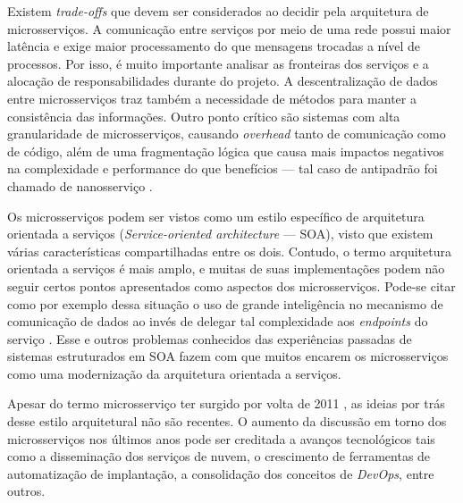 Existem \emph{trade-offs} que devem ser considerados ao decidir pela arquitetura de microsserviços. A comunicação entre serviços por meio de uma rede possui maior latência e exige maior processamento do que mensagens trocadas a nível de processos. Por isso, é muito importante analisar as fronteiras dos serviços e a alocação de responsabilidades durante do projeto. A descentralização de dados entre microsserviços traz também a necessidade de métodos para manter a consistência das informações. Outro ponto crítico são sistemas com alta granularidade de microsserviços, causando \emph{overhead} tanto de comunicação como de código, além de uma fragmentação lógica que causa mais impactos negativos na complexidade e performance do que benefícios --- tal caso de antipadrão foi chamado de nanosserviço \cite{rotem}.

Os microsserviços podem ser vistos como um estilo específico de arquitetura orientada a serviços (\textit{Service-oriented architecture} --- SOA), visto que existem várias características compartilhadas entre os dois. Contudo, o termo arquitetura orientada a serviços é mais amplo, e muitas de suas implementações podem não seguir certos pontos apresentados como aspectos dos microsserviços. Pode-se citar como por exemplo dessa situação o uso de grande inteligência no mecanismo de comunicação de dados ao invés de delegar tal complexidade aos \emph{endpoints} do serviço \cite{james}. Esse e outros problemas conhecidos das experiências passadas de sistemas estruturados em SOA fazem com que muitos encarem os microsserviços como uma modernização da arquitetura orientada a serviços.

Apesar do termo microsserviço ter surgido por volta de 2011 \cite{james}, as ideias por trás desse estilo arquitetural não são recentes. O aumento da discussão em torno dos microsserviços nos últimos anos pode ser creditada a avanços tecnológicos tais como a disseminação dos serviços de nuvem, o crescimento de ferramentas de automatização de implantação, a consolidação dos conceitos de \emph{DevOps}, entre outros.
